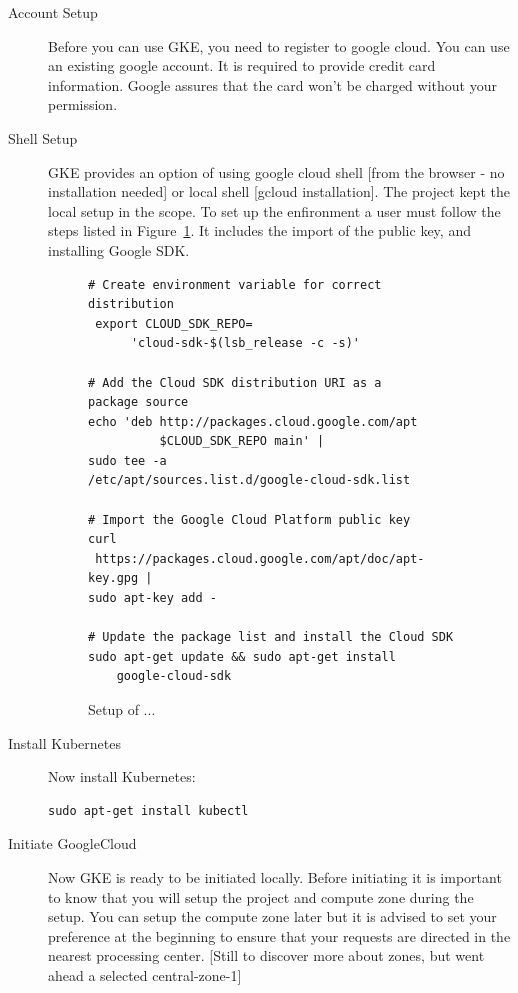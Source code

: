 \begin{description}

\item[Account Setup] Before you can use GKE, you need to register to google
  cloud. You can use an existing google account. It is required to provide
  credit card information.  Google assures that the card won't be charged
  without your permission.

\item[Shell Setup] GKE provides an option of using google cloud shell
  [from the browser - no installation needed] or local shell [gcloud
  installation].  The project kept the local setup in the scope. To
  set up the enfironment a user must follow the steps listed in
  Figure~\ref{F:setup}. It includes the import of the public key, and
  installing Google SDK.

\begin{figure}
\begin{footnotesize}
\begin{verbatim}
# Create environment variable for correct 
distribution
 export CLOUD_SDK_REPO=
      'cloud-sdk-$(lsb_release -c -s)'

# Add the Cloud SDK distribution URI as a 
package source
echo 'deb http://packages.cloud.google.com/apt 
          $CLOUD_SDK_REPO main' | 
sudo tee -a 
/etc/apt/sources.list.d/google-cloud-sdk.list

# Import the Google Cloud Platform public key
curl
 https://packages.cloud.google.com/apt/doc/apt-key.gpg | 
sudo apt-key add -

# Update the package list and install the Cloud SDK
sudo apt-get update && sudo apt-get install 
    google-cloud-sdk
\end{verbatim}

\end{footnotesize}
\caption{Setup of ...}\label{F:setup}
\end{figure}


\item[Install Kubernetes] Now install Kubernetes:

\begin{verbatim}
sudo apt-get install kubectl
\end{verbatim}

\item[Initiate GoogleCloud] Now GKE is ready to be initiated locally. Before
initiating it is important to know that you will setup the project and compute
zone during the setup. You can setup the compute zone later but it is advised
to set your preference at the beginning to ensure that your requests are
directed in the nearest processing center. [Still to discover more about
zones, but went ahead a selected central-zone-1] 


\end{description}
